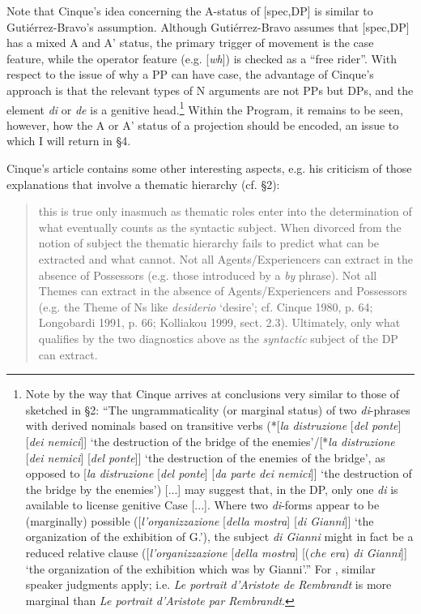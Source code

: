 \documentclass[output=paper]{langsci/langscibook}
\begin{document}
Note that Cinque’s idea concerning the A-status of [spec,DP] is similar to Gutiérrez-Bravo’s assumption. Although Gutiérrez-Bravo assumes that [spec,\linebreak DP] has a mixed A and A’ status, the primary trigger of movement is the case feature, while the operator feature (e.g. [\textit{wh}]) is checked as a “free rider”. With respect to the issue of why a PP can have case, the advantage of Cinque’s approach is that the relevant types of N arguments are not PPs but DPs, and the element \textit{di} or  \textit{de} is a genitive head.\footnote{Note by the way that Cinque arrives at conclusions very similar to those of \citet{Kolliakou1999} sketched in §2: “The ungrammaticality (or marginal status) of two \textit{di}{}-phrases with derived nominals based on transitive verbs (*[\textit{la distruzione} [\textit{del ponte}] [\textit{dei nemici}]] ‘the destruction of the bridge of the enemies’/[*\textit{la distruzione} [\textit{dei nemici}] [\textit{del ponte}]] ‘the destruction of the enemies of the bridge’, as opposed to [\textit{la distruzione} [\textit{del ponte}] [\textit{da parte dei nemici}]] ‘the destruction of the bridge by the enemies’) [...] may suggest that, in the  DP, only one \textit{di} is available to license genitive Case [...]. Where two \textit{di}-forms appear to be (marginally) possible ([\textit{l’organizzazione} [\textit{della mostra}] [\textit{di Gianni}]] ‘the organization of the exhibition of G.’), the subject \textit{di Gianni} might in fact be a reduced relative clause ([\textit{l’organizzazione} [\textit{della mostra}] [(\textit{che era}) \textit{di Gianni}]] ‘the organization of the exhibition which was by Gianni’.” For , similar speaker judgments apply; i.e. \textit{Le portrait d’Aristote de Rembrandt} is more marginal than \textit{Le portrait d’Aristote par Rembrandt}.} Within the  Program, it remains to be seen, however, how the A or A’ status of a projection should be encoded, an issue to which I will return in §4.

Cinque’s article contains some other interesting aspects, e.g. his criticism of those explanations that involve a thematic hierarchy (cf. §2):

\begin{quote}\relax [...] this is true only inasmuch as thematic roles enter into the determination of what eventually counts as the syntactic subject. When divorced from the notion of subject the thematic hierarchy fails to predict what can be extracted and what cannot. Not all Agents/Experiencers can extract in the absence of Possessors (e.g. those introduced by a \textit{by} phrase). Not all Themes can extract in the absence of Agents/Experiencers and Possessors (e.g. the Theme of Ns like \textit{desiderio} ‘desire’; cf. Cinque 1980, p. 64; Longobardi 1991, p. 66; Kolliakou 1999, sect. 2.3). Ultimately, only what qualifies by the two diagnostics above as the \textit{syntactic} subject of the DP can extract.\\\hbox{}\hfill{\citep[95–96, Footnote 1]{Cinque2014}}\end{quote}
\end{document}
